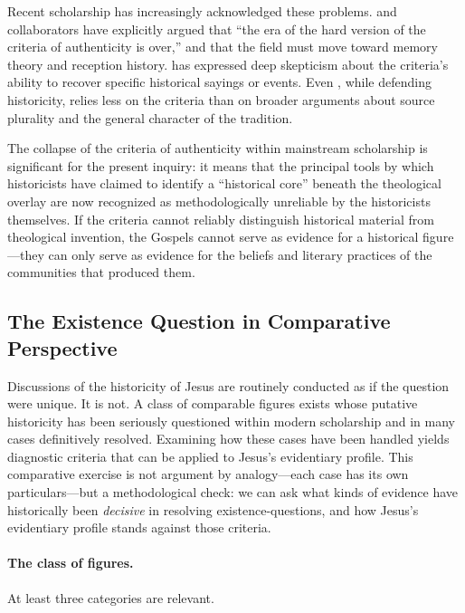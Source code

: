 \documentclass[12pt,oneside]{article}
\begin{document}
Recent scholarship has increasingly acknowledged these problems.
\citet{Keith2024} and collaborators have explicitly argued that ``the
era of the hard version of the criteria of authenticity is over,'' and
that the field must move toward memory theory and reception history.
\citet{Allison2010} has expressed deep skepticism about the criteria's
ability to recover specific historical sayings or events.  Even
\citet{Ehrman2012}, while defending historicity, relies less on the
criteria than on broader arguments about source plurality and the
general character of the tradition.

The collapse of the criteria of authenticity within mainstream
scholarship is significant for the present inquiry: it means that the
principal tools by which historicists have claimed to identify a
``historical core'' beneath the theological overlay are now recognized
as methodologically unreliable by the historicists themselves.  If the
criteria cannot reliably distinguish historical material from
theological invention, the Gospels cannot serve as evidence for a
historical figure---they can only serve as evidence for the beliefs and
literary practices of the communities that produced them.

\subsection{The Existence Question in Comparative Perspective}
\label{sec:method:comparative}

Discussions of the historicity of Jesus are routinely conducted as if
the question were unique.  It is not.  A class of comparable figures
exists whose putative historicity has been seriously questioned within
modern scholarship and in many cases definitively resolved.  Examining
how these cases have been handled yields diagnostic criteria that can
be applied to Jesus's evidentiary profile.  This comparative exercise
is not argument by analogy---each case has its own particulars---but a
methodological check: we can ask what kinds of evidence have
historically been \textit{decisive} in resolving existence-questions,
and how Jesus's evidentiary profile stands against those criteria.

\paragraph{The class of figures.}
At least three categories are relevant.
\end{document}
